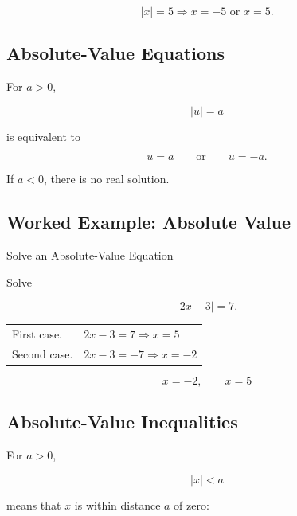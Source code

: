 \[ |x|=5\Longrightarrow x=-5\text{ or }x=5. \]

\subsection{Absolute-Value Equations}
\label{subsec:absolute-value-equations}

For \(a>0\),

\[ |u|=a \]

is equivalent to

\[ u=a\qquad\text{or}\qquad u=-a. \]

If \(a<0\), there is no real solution.

\subsection{Worked Example: Absolute Value}
\label{subsec:worked-absolute-equation}

\begin{workedexamplebox}{Solve an Absolute-Value Equation}

Solve

\[ |2x-3|=7. \]

\begin{tabularx}{\textwidth}{@{}>{\raggedright\arraybackslash}p{}X@{}}
First case. & \(2x-3=7\Rightarrow x=5\)\\
Second case. & \(2x-3=-7\Rightarrow x=-2\)
\end{tabularx}

\begin{answerbox}
\[ x=-2,\qquad x=5 \]
\end{answerbox}
\end{workedexamplebox}

\subsection{Absolute-Value Inequalities}
\label{subsec:absolute-value-inequalities}

For \(a>0\),

\[ |x|<a \]

means that \(x\) is within distance \(a\) of zero:

